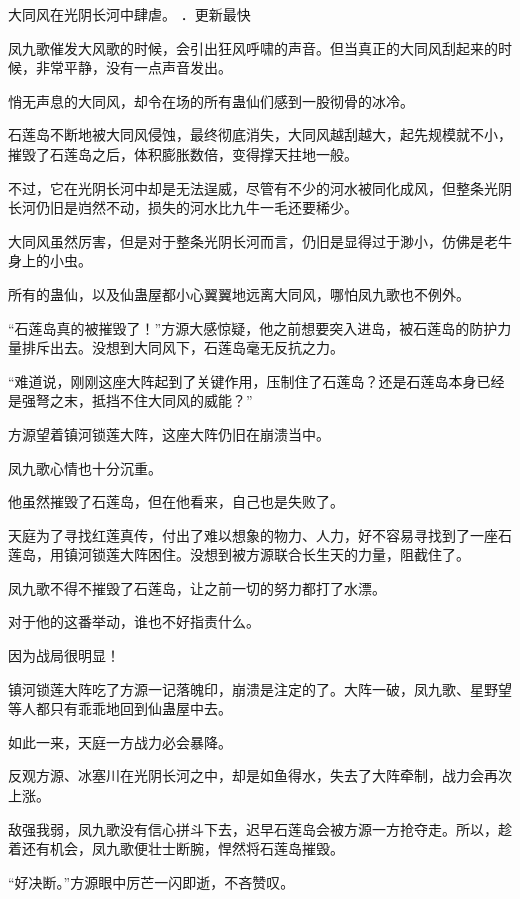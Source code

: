 
\begin{this_body}

大同风在光阴长河中肆虐。 ．更新最快

凤九歌催发大风歌的时候，会引出狂风呼啸的声音。但当真正的大同风刮起来的时候，非常平静，没有一点声音发出。

悄无声息的大同风，却令在场的所有蛊仙们感到一股彻骨的冰冷。

石莲岛不断地被大同风侵蚀，最终彻底消失，大同风越刮越大，起先规模就不小，摧毁了石莲岛之后，体积膨胀数倍，变得撑天拄地一般。

不过，它在光阴长河中却是无法逞威，尽管有不少的河水被同化成风，但整条光阴长河仍旧是岿然不动，损失的河水比九牛一毛还要稀少。

大同风虽然厉害，但是对于整条光阴长河而言，仍旧是显得过于渺小，仿佛是老牛身上的小虫。

所有的蛊仙，以及仙蛊屋都小心翼翼地远离大同风，哪怕凤九歌也不例外。

“石莲岛真的被摧毁了！”方源大感惊疑，他之前想要突入进岛，被石莲岛的防护力量排斥出去。没想到大同风下，石莲岛毫无反抗之力。

“难道说，刚刚这座大阵起到了关键作用，压制住了石莲岛？还是石莲岛本身已经是强弩之末，抵挡不住大同风的威能？”

方源望着镇河锁莲大阵，这座大阵仍旧在崩溃当中。

凤九歌心情也十分沉重。

他虽然摧毁了石莲岛，但在他看来，自己也是失败了。

天庭为了寻找红莲真传，付出了难以想象的物力、人力，好不容易寻找到了一座石莲岛，用镇河锁莲大阵困住。没想到被方源联合长生天的力量，阻截住了。

凤九歌不得不摧毁了石莲岛，让之前一切的努力都打了水漂。

对于他的这番举动，谁也不好指责什么。

因为战局很明显！

镇河锁莲大阵吃了方源一记落魄印，崩溃是注定的了。大阵一破，凤九歌、星野望等人都只有乖乖地回到仙蛊屋中去。

如此一来，天庭一方战力必会暴降。

反观方源、冰塞川在光阴长河之中，却是如鱼得水，失去了大阵牵制，战力会再次上涨。

敌强我弱，凤九歌没有信心拼斗下去，迟早石莲岛会被方源一方抢夺走。所以，趁着还有机会，凤九歌便壮士断腕，悍然将石莲岛摧毁。

“好决断。”方源眼中厉芒一闪即逝，不吝赞叹。


\end{this_body}
